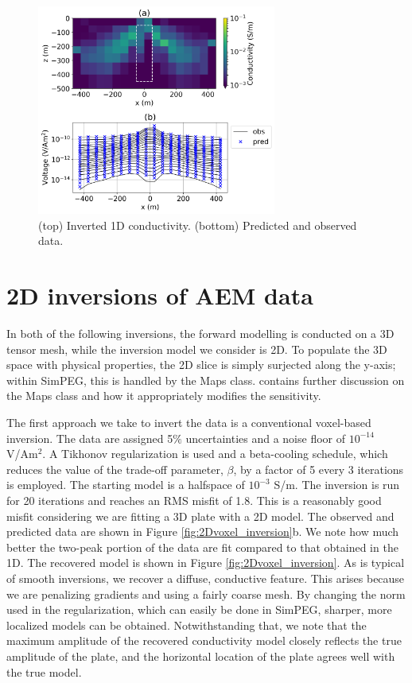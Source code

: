 \documentclass[paper]{geophysics}
\begin{document}
\begin{figure}[!htb]
  \centering
  \includegraphics[width=0.7\textwidth]{figures/1Dinversion.png}
  \caption{(top) Inverted 1D conductivity. (bottom) Predicted and observed data.}
  \label{fig:1Dinversion}
\end{figure}


\section{2D inversions of AEM data}

In both of the following inversions, the forward modelling is conducted on a 3D tensor mesh, while the inversion model we consider is 2D. To populate the 3D space with physical properties, the 2D slice is simply surjected along the y-axis; within SimPEG, this is handled by the Maps class. \cite{kang2015c} contains further discussion on the Maps class and how it appropriately modifies the sensitivity.

The first approach we take to invert the data is a conventional voxel-based inversion. The data are assigned 5$\%$ uncertainties and a noise floor of $10^{-14}$ V/Am$^2$. A Tikhonov regularization is used and a beta-cooling schedule, which reduces the value of the trade-off parameter, $\beta$, by a factor of 5 every 3 iterations is employed. The starting model is a halfspace of $10^{-3}$ S/m. The inversion is run for 20 iterations and reaches an RMS misfit of 1.8. This is a reasonably good misfit considering we are fitting a 3D plate with a 2D model. The observed and predicted data are shown in Figure \ref{fig:2Dvoxel_inversion}b. We note how much better the two-peak portion of the data are fit compared to that obtained in the 1D. The recovered model is shown in Figure \ref{fig:2Dvoxel_inversion}. As is typical of smooth inversions, we recover a diffuse, conductive feature. This arises because we are penalizing gradients and using a fairly coarse mesh. By changing the norm used in the regularization, which can easily be done in SimPEG, sharper, more localized models can be obtained. Notwithstanding that, we note that the maximum amplitude of the recovered conductivity model closely reflects the true amplitude of the plate, and the horizontal location of the plate agrees well with the true model.
\end{document}
